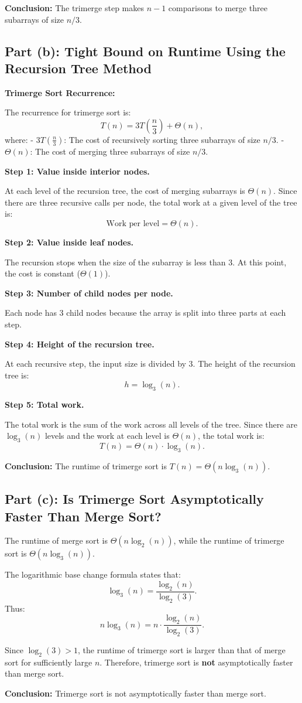 \documentclass{article}
\begin{document}
\textbf{Conclusion:} The trimerge step makes \( n - 1 \) comparisons to merge three subarrays of size \( n/3 \).

\subsection*{Part (b): Tight Bound on Runtime Using the Recursion Tree Method}

\textbf{Trimerge Sort Recurrence:}

The recurrence for trimerge sort is:
\[
T(n) = 3T\left(\frac{n}{3}\right) + \Theta(n),
\]
where:
- \( 3T\left(\frac{n}{3}\right) \): The cost of recursively sorting three subarrays of size \( n/3 \).
- \( \Theta(n) \): The cost of merging three subarrays of size \( n/3 \).

\textbf{Step 1: Value inside interior nodes.}

At each level of the recursion tree, the cost of merging subarrays is \( \Theta(n) \). Since there are three recursive calls per node, the total work at a given level of the tree is:
\[
\text{Work per level} = \Theta(n).
\]

\textbf{Step 2: Value inside leaf nodes.}

The recursion stops when the size of the subarray is less than 3. At this point, the cost is constant (\( \Theta(1) \)).

\textbf{Step 3: Number of child nodes per node.}

Each node has 3 child nodes because the array is split into three parts at each step.

\textbf{Step 4: Height of the recursion tree.}

At each recursive step, the input size is divided by 3. The height of the recursion tree is:
\[
h = \log_3(n).
\]

\textbf{Step 5: Total work.}

The total work is the sum of the work across all levels of the tree. Since there are \( \log_3(n) \) levels and the work at each level is \( \Theta(n) \), the total work is:
\[
T(n) = \Theta(n) \cdot \log_3(n).
\]

\textbf{Conclusion:} The runtime of trimerge sort is \( T(n) = \Theta(n \log_3(n)) \).

\subsection*{Part (c): Is Trimerge Sort Asymptotically Faster Than Merge Sort?}

The runtime of merge sort is \( \Theta(n \log_2(n)) \), while the runtime of trimerge sort is \( \Theta(n \log_3(n)) \).

The logarithmic base change formula states that:
\[
\log_3(n) = \frac{\log_2(n)}{\log_2(3)}.
\]
Thus:
\[
n \log_3(n) = n \cdot \frac{\log_2(n)}{\log_2(3)}.
\]

Since \( \log_2(3) > 1 \), the runtime of trimerge sort is larger than that of merge sort for sufficiently large \( n \). Therefore, trimerge sort is \textbf{not} asymptotically faster than merge sort.

\textbf{Conclusion:} Trimerge sort is not asymptotically faster than merge sort.
\end{document}
